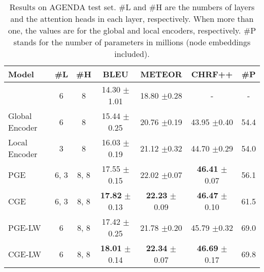 \documentclass[11pt,a4paper]{article}
\begin{document}
\begin{table*}[h]
\centering
{\renewcommand{\arraystretch}{0.8}
\begin{tabular}{lcccccc}  
\toprule
\textbf{Model} & \textbf{\#L} & \textbf{\#H} & \textbf{BLEU} & \textbf{METEOR} & \textbf{CHRF++} & \textbf{\#P}   \\
\midrule
 \citet{koncel-kedziorski-etal-2019-text} & 6 & 8 & 14.30 {\small $\pm$1.01}& 18.80 {\small $\pm$0.28} & - & - \\
\midrule
 Global Encoder & 6 & 8 & 15.44 {\small $\pm$0.25} & 20.76 {\small $\pm$0.19} & 43.95 {\small $\pm$0.40} & 54.4 \\
 Local Encoder & 3 & 8 & 16.03 {\small $\pm$0.19} & 21.12 {\small $\pm$0.32} & 44.70 {\small $\pm$0.29} & 54.0 \\
  PGE & 6, 3 & 8, 8 & 17.55 {\small $\pm$0.15} & 22.02 {\small $\pm$0.07} & \textbf{46.41} {\small $\pm$0.07}& 56.1 \\
 CGE & 6, 3 & 8, 8 & \textbf{17.82} {\small $\pm$0.13} & \textbf{22.23} {\small $\pm$0.09} & \textbf{46.47} {\small $\pm$0.10} & 61.5 \\
   PGE-LW  & 6 & 8, 8 & 17.42 {\small $\pm$0.25} & 21.78 {\small $\pm$0.20} & 45.79 {\small $\pm$0.32} & 69.0 \\
  CGE-LW & 6 & 8, 8 & \textbf{18.01} {\small $\pm$0.14} & \textbf{22.34} {\small $\pm$0.07} & \textbf{46.69} {\small $\pm$0.17} & 69.8 \\
\bottomrule
\end{tabular}}
\caption{Results on AGENDA test set. \#L and \#H are the numbers of layers and the attention heads in each layer, respectively. When more than one, the values are for the global and local encoders, respectively. \#P stands for the number of parameters in millions (node embeddings included).}
\label{tab:AGENDAtestresults}
\end{table*}
\end{document}
